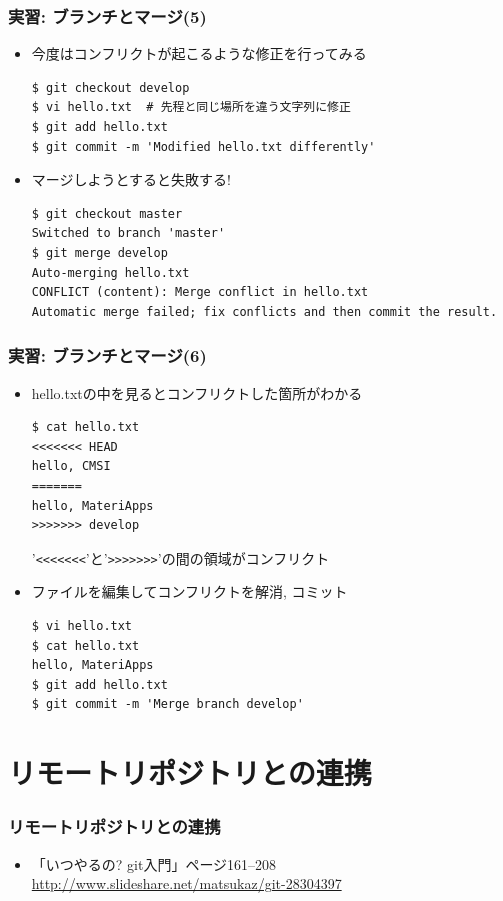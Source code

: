 \begin{frame}[t,fragile]
  \frametitle{実習: ブランチとマージ(5)}
  \begin{itemize}
  \item 今度はコンフリクトが起こるような修正を行ってみる
\begin{lstlisting}
$ git checkout develop
$ vi hello.txt  # 先程と同じ場所を違う文字列に修正
$ git add hello.txt
$ git commit -m 'Modified hello.txt differently'
\end{lstlisting}
  \item マージしようとすると失敗する!
\begin{lstlisting}
$ git checkout master
Switched to branch 'master'
$ git merge develop
Auto-merging hello.txt
CONFLICT (content): Merge conflict in hello.txt
Automatic merge failed; fix conflicts and then commit the result.
\end{lstlisting}
  \end{itemize}
\end{frame}

\begin{frame}[t,fragile]
  \frametitle{実習: ブランチとマージ(6)}
  \begin{itemize}
  \item hello.txtの中を見るとコンフリクトした箇所がわかる
\begin{lstlisting}
$ cat hello.txt
<<<<<<< HEAD
hello, CMSI
=======
hello, MateriApps
>>>>>>> develop
\end{lstlisting}
'\verb+<<<<<<<+'と'\verb+>>>>>>>+'の間の領域がコンフリクト \\[.0em]
  \item ファイルを編集してコンフリクトを解消, コミット
\begin{lstlisting}
$ vi hello.txt
$ cat hello.txt
hello, MateriApps
$ git add hello.txt
$ git commit -m 'Merge branch develop'
\end{lstlisting}
  \end{itemize}
\end{frame}

\section{リモートリポジトリとの連携}

\begin{frame}
  \frametitle{リモートリポジトリとの連携}
  \begin{itemize}
  \item 「いつやるの? git入門」ページ161--208 \\
    \url{http://www.slideshare.net/matsukaz/git-28304397}
  \end{itemize}
\end{frame}

